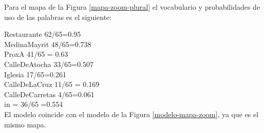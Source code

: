 



Para el mapa de la Figura \ref{mapa-zoom-plural} el vocabulario y probabilidades de uso de las palabras es el siguiente:

Restaurante 62/65=0.95\\
MedinaMayrit 48/65=0.738\\
ProxA 41/65 = 0.63\\
CalleDeAtocha  33/65=0.507\\
Iglesia 17/65=0.261\\
CalleDeLaCruz 11/65 = 0.169\\
CalleDeCarretas 4/65=0.061\\
in = 36/65 =0.554\\


El modelo coincide con el modelo de la Figura \ref{modelo-mapa-zoom}, ya que es el mismo mapa.


%
%

